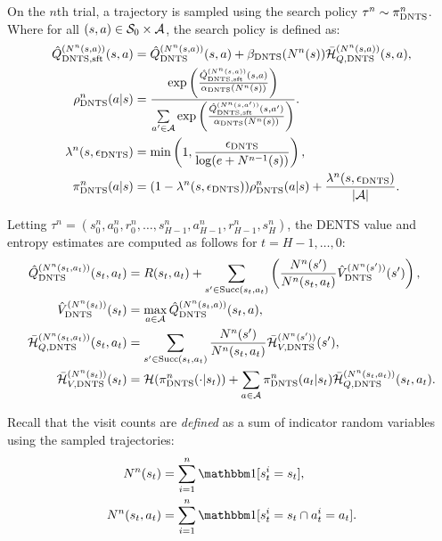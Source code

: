     On the $n$th trial, a trajectory is sampled using the search policy $\tau^n \sim {\pi^{n}_{{\textnormal{DNTS}}}}$. Where for all $(s,a)\in\mathcal{S}_0\times\mathcal{A}$, the search policy is defined as:
    \begin{align}
        {\hat{Q}^{(N^n(s,a))}_{{\textnormal{DNTS}},{\textnormal{sft}}}}(s,a) &= {\hat{Q}^{(N^n(s,a))}_{{\textnormal{DNTS}}}}(s,a) + {\beta_{{\textnormal{DNTS}}}}(N^n(s)){\bar{\mathcal{H}}^{(N^n(s,a))}_{Q,{\textnormal{DNTS}}}}(s,a), \label{appeq:dents_q_sft} \\
        {\rho^{n}_{{\textnormal{DNTS}}}}(a|s) &= \frac{
                \exp\left(\frac{{\hat{Q}^{(N^n(s,a))}_{{\textnormal{DNTS}},{\textnormal{sft}}}}(s,a)}{{\alpha_{{\textnormal{DNTS}}}}(N^n(s))}\right)
            }{
                \sum\limits_{a'\in\mathcal{A}} \exp\left(\frac{{\hat{Q}^{(N^n(s,a'))}_{{\textnormal{DNTS}},{\textnormal{sft}}}}(s,a')}{{\alpha_{{\textnormal{DNTS}}}}(N^n(s))}\right)
            }.  \label{appeq:full_rho} \\
        \lambda^n(s,{\epsilon_{{\textnormal{DNTS}}}}) &= \min\left(1, \frac{{\epsilon_{{\textnormal{DNTS}}}}}{\log(e+N^{n-1}(s))}\right),  \\
        {\pi^{n}_{{\textnormal{DNTS}}}}(a|s) &= (1-{\lambda^{n}(s,{\epsilon_{{\textnormal{DNTS}}}})}){\rho^{n}_{{\textnormal{DNTS}}}}(a|s) + \frac{{\lambda^{n}(s,{\epsilon_{{\textnormal{DNTS}}}})}}{|\mathcal{A}|}. 
            \label{appeq:dents_search_policy}  \\
    \end{align}

    Letting $\tau^n=(s^n_0,a^n_0,r^n_0,\ldots,s^n_{H-1},a^n_{H-1},r^n_{H-1},s^n_{H})$, the DENTS value and entropy estimates are computed as follows for $t=H-1,\ldots,0$:
    \begin{align}
        {\hat{Q}^{(N^n(s_t,a_t))}_{{\textnormal{DNTS}}}}(s_t,a_t) &= 
            R(s_t,a_t) + \sum_{s' \in {\textnormal{Succ}(s_t,a_t)}} \left( 
                \frac{N^n(s')}{N^n(s_t,a_t)} {\hat{V}^{(N^n(s'))}_{{\textnormal{DNTS}}}}(s') \right), 
            \label{appeq:dp_q_backup} \\ 
        {\hat{V}^{(N^n(s_t))}_{{\textnormal{DNTS}}}}(s_t) &=\max_{a\in\mathcal{A}} {\hat{Q}^{(N^n(s_t,a))}_{{\textnormal{DNTS}}}}(s_t,a), 
            \label{appeq:dp_v_backup} \\
        {\bar{\mathcal{H}}^{(N^n(s_t,a_t))}_{Q,{\textnormal{DNTS}}}}(s_t,a_t) &= 
            \sum_{s'\in {\textnormal{Succ}(s_t,a_t)}} \frac{N^n(s')}{N^n(s_t,a_t)} {\bar{\mathcal{H}}^{(N^n(s'))}_{V,{\textnormal{DNTS}}}}(s'), \\
        {\bar{\mathcal{H}}^{(N^n(s_t))}_{V,{\textnormal{DNTS}}}}(s_t) &= 
            \mathcal{H}({\pi^{n}_{{\textnormal{DNTS}}}}(\cdot | s_t)) 
                + \sum_{a\in\mathcal{A}} {\pi^{n}_{{\textnormal{DNTS}}}}(a_t|s_t){\bar{\mathcal{H}}^{(N^n(s_t,a_t))}_{Q,{\textnormal{DNTS}}}}(s_t,a_t).
    \end{align}

    Recall that the visit counts are \textit{defined} as a sum of indicator random variables using the sampled trajectories:
    \begin{align}
        N^n(s_t) &= \sum_{i=1}^n \one[s^i_t = s_t], \\
        N^n(s_t,a_t) &= \sum_{i=1}^n \one[s^i_t = s_t \cap a^i_t = a_t].
    \end{align}

